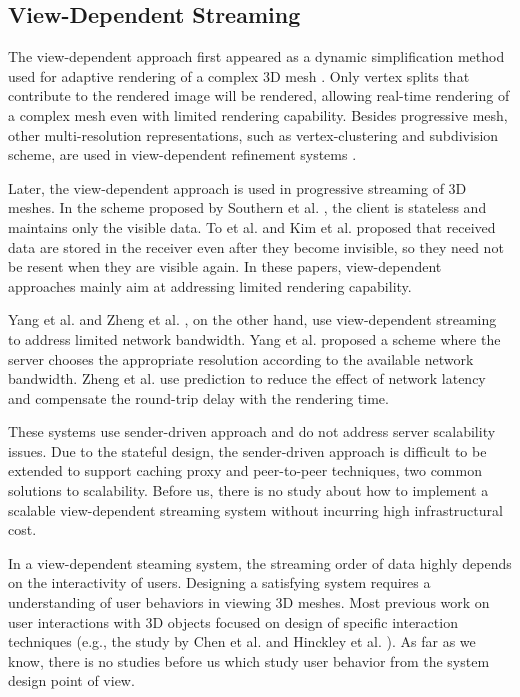 \documentclass[11pt, a4paper]{report}
\begin{document}
    \subsection{View-Dependent Streaming}
    The view-dependent approach first appeared as 
    a dynamic simplification method used for adaptive rendering of a complex 3D mesh
    \cite{258843, 258847}. Only vertex splits that contribute to the rendered
    image will be rendered, allowing real-time rendering of a complex mesh
    even with limited rendering capability.
    Besides progressive mesh, other multi-resolution representations, 
    such as vertex-clustering  and subdivision scheme,
    are used in view-dependent refinement systems \cite{245627, efficient:Alliez,602344}.

    Later, the view-dependent approach is used in progressive 
	streaming of 3D meshes.     
    In the scheme proposed by Southern et al. \cite{363375},  the client is stateless and
    maintains only the visible data. 
    To et al. \cite{To1999}
    and Kim et al. \cite{kim:view} proposed that received data are stored
    in the receiver even after they become invisible, 
    so they need not be resent when they are visible again. 
    In these papers, view-dependent approaches mainly aim at addressing
    limited rendering capability. 
    
    Yang et al. \cite{progressive:Yang} and
    Zheng et al. \cite{zheng:interactive}, on the other hand, use
    view-dependent streaming to address limited network bandwidth.
    Yang et al. proposed a scheme where the server chooses the appropriate resolution
    according to the available network bandwidth.
    Zheng et al. \cite{zheng:interactive} use prediction to
    reduce the effect of network latency and 
    compensate the round-trip delay with the rendering time.
     
    These systems use sender-driven approach and do not address
    server scalability issues. Due to the stateful design, 
    the sender-driven approach is difficult to be extended to
    support caching proxy and peer-to-peer techniques, two 
    common solutions to scalability. Before us, there is no study about
    how to implement a scalable 
    view-dependent streaming system without incurring high infrastructural cost.

    In a view-dependent steaming system, the streaming order of data highly
    depends on the interactivity of users. Designing a satisfying system
    requires a understanding of user behaviors in viewing 3D meshes.
    Most previous work on user interactions with 3D objects focused on design
    of specific interaction techniques (e.g., the study by Chen et al. \cite{chen88study}
    and Hinckley et al. \cite{hinckley97usability}). 
    As far as we know, there is no studies before us which study user behavior
    from the system design point of view.
    
\end{document}
